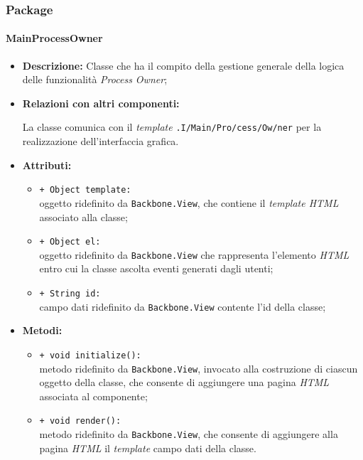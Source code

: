 \subsubsection{Package \logicAdmin{}}

\paragraph{MainProcessOwner}
\label{mainProcessOwner}
\begin{flushleft}
\begin{itemize}
\item \textbf{Descrizione:} Classe che ha il compito della gestione generale della logica delle funzionalità \textit{Process Owner};
\item \textbf{Relazioni con altri componenti:}
\begin{sloppypar}
La classe comunica con il \textit{template} \texttt{\viewAdmin{}.I\fshyp{}Main\fshyp{}Pro\fshyp{}cess\fshyp{}Ow\fshyp{}ner} per la realizzazione dell'interfaccia grafica.
\end{sloppypar}
\item \textbf{Attributi:}
\begin{sloppypar}
\begin{itemize}
\item \texttt{+ Object template:}\\ oggetto ridefinito da \texttt{Backbone.View}, che contiene il \textit{template HTML} associato alla classe;
\item \texttt{+ Object el:}\\ oggetto ridefinito da \texttt{Backbone.View} che rappresenta l'elemento \textit{HTML} entro cui la classe ascolta eventi generati dagli utenti;
\item \texttt{+ String id:}\\ campo dati ridefinito da \texttt{Backbone.View} contente l'id della classe;
\end{itemize}
\end{sloppypar}
\item \textbf{Metodi:}
\begin{sloppypar}
\begin{itemize}
\item \texttt{+ void initialize():}\\ metodo ridefinito da \texttt{Backbone.View}, invocato alla costruzione di ciascun oggetto della classe, che consente di aggiungere una pagina \textit{HTML} associata al componente;
\item \texttt{+ void render():}\\ metodo ridefinito da \texttt{Backbone.View}, che consente di aggiungere alla pagina \textit{HTML} il \textit{template} campo dati della classe.
\end{itemize}
\end{sloppypar}
\end{itemize}
\end{flushleft}

